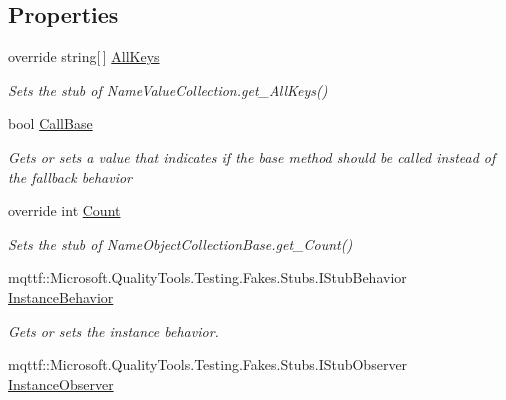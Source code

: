 \subsection*{Properties}
\begin{DoxyCompactItemize}
\item 
override string\mbox{[}$\,$\mbox{]} \hyperlink{class_system_1_1_collections_1_1_specialized_1_1_fakes_1_1_stub_name_value_collection_acd469dd9f1f03ca591b7c9a5fda8595d}{All\-Keys}
\begin{DoxyCompactList}\small\item\em Sets the stub of Name\-Value\-Collection.\-get\-\_\-\-All\-Keys()\end{DoxyCompactList}\item 
bool \hyperlink{class_system_1_1_collections_1_1_specialized_1_1_fakes_1_1_stub_name_value_collection_a57407cd9bcfeab618416a5f0e9271edf}{Call\-Base}
\begin{DoxyCompactList}\small\item\em Gets or sets a value that indicates if the base method should be called instead of the fallback behavior\end{DoxyCompactList}\item 
override int \hyperlink{class_system_1_1_collections_1_1_specialized_1_1_fakes_1_1_stub_name_value_collection_a8999671cce76a4a96655e5f347a6f85c}{Count}
\begin{DoxyCompactList}\small\item\em Sets the stub of Name\-Object\-Collection\-Base.\-get\-\_\-\-Count()\end{DoxyCompactList}\item 
mqttf\-::\-Microsoft.\-Quality\-Tools.\-Testing.\-Fakes.\-Stubs.\-I\-Stub\-Behavior \hyperlink{class_system_1_1_collections_1_1_specialized_1_1_fakes_1_1_stub_name_value_collection_a957c9aaf2b58b355b3172524ccc5108e}{Instance\-Behavior}
\begin{DoxyCompactList}\small\item\em Gets or sets the instance behavior.\end{DoxyCompactList}\item 
mqttf\-::\-Microsoft.\-Quality\-Tools.\-Testing.\-Fakes.\-Stubs.\-I\-Stub\-Observer \hyperlink{class_system_1_1_collections_1_1_specialized_1_1_fakes_1_1_stub_name_value_collection_acbbb9ecfe72789795195fc67d3e86d9b}{Instance\-Observer}

\end{DoxyCompactItemize}
